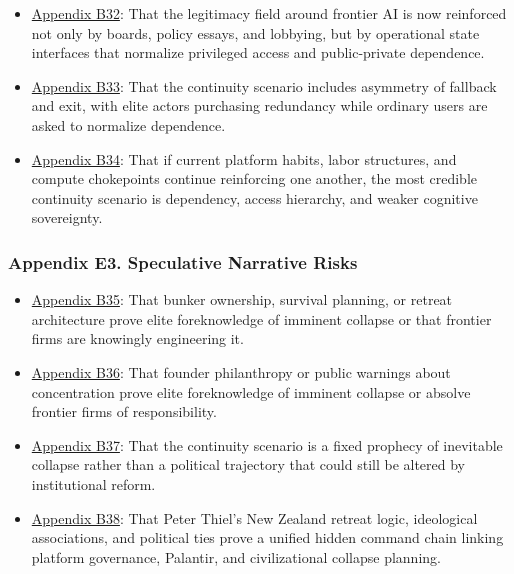 \documentclass[
  american,
  11pt,
  letterpaper,
]{article}
\providecommand{\tightlist}{%
  \setlength{\itemsep}{0pt}\setlength{\parskip}{0pt}}
\begin{document}
\begin{itemize}
\tightlist
\item
  \hyperref[appendix-b32-the-legitimacy-field-around-frontier-ai-is-now-reinforced-not-only-by-boards-pol]{Appendix
  B32}: That the legitimacy field around frontier AI is now reinforced
  not only by boards, policy essays, and lobbying, but by operational
  state interfaces that normalize privileged access and public-private
  dependence.
\item
  \hyperref[appendix-b33-the-continuity-scenario-includes-asymmetry-of-fallback-and-exit-with-elite-actor]{Appendix
  B33}: That the continuity scenario includes asymmetry of fallback and
  exit, with elite actors purchasing redundancy while ordinary users are
  asked to normalize dependence.
\item
  \hyperref[appendix-b34-if-current-platform-habits-labor-structures-and-compute-chokepoints-continue-re]{Appendix
  B34}: That if current platform habits, labor structures, and compute
  chokepoints continue reinforcing one another, the most credible
  continuity scenario is dependency, access hierarchy, and weaker
  cognitive sovereignty.
\end{itemize}

\subsubsection{Appendix E3. Speculative Narrative
Risks}\label{appendix-e3-speculative-narrative-risks}

\begin{itemize}
\tightlist
\item
  \hyperref[appendix-b35-bunker-ownership-survival-planning-or-retreat-architecture-prove-elite-foreknow]{Appendix
  B35}: That bunker ownership, survival planning, or retreat
  architecture prove elite foreknowledge of imminent collapse or that
  frontier firms are knowingly engineering it.
\item
  \hyperref[appendix-b36-founder-philanthropy-or-public-warnings-about-concentration-prove-elite-foreknowl]{Appendix
  B36}: That founder philanthropy or public warnings about concentration
  prove elite foreknowledge of imminent collapse or absolve frontier
  firms of responsibility.
\item
  \hyperref[appendix-b37-the-continuity-scenario-is-a-fixed-prophecy-of-inevitable-collapse-rather-than-a]{Appendix
  B37}: That the continuity scenario is a fixed prophecy of inevitable
  collapse rather than a political trajectory that could still be
  altered by institutional reform.
\item
  \hyperref[appendix-b38-peter-thiel-s-new-zealand-retreat-logic-ideological-associations-and-political]{Appendix
  B38}: That Peter Thiel's New Zealand retreat logic, ideological
  associations, and political ties prove a unified hidden command chain
  linking platform governance, Palantir, and civilizational collapse
  planning.
\end{itemize}
\end{document}
